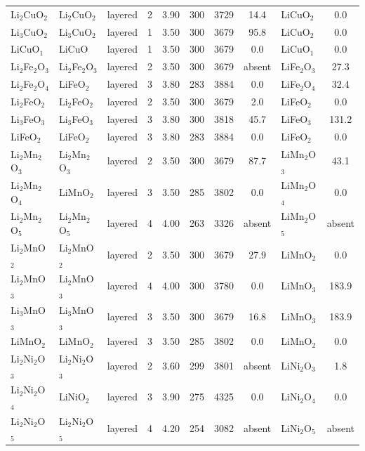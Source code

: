 \documentclass[10pt]{article}
\begin{document}
\begin{center}
\begin{longtable}{l l l c c c c c l c}
Li$_{2}$CuO$_{2}$ & Li$_{2}$CuO$_{2}$ & layered & 2 & 3.90 & 300 & 3729 & 14.4 & LiCuO$_{2}$ & 0.0 \\
Li$_{3}$CuO$_{2}$ & Li$_{3}$CuO$_{2}$ & layered & 1 & 3.50 & 300 & 3679 & 95.8 & LiCuO$_{2}$ & 0.0 \\
LiCuO$_{1}$ & LiCuO & layered & 1 & 3.50 & 300 & 3679 & 0.0 & LiCuO$_{1}$ & 0.0 \\
Li$_{2}$Fe$_{2}$O$_{3}$ & Li$_{2}$Fe$_{2}$O$_{3}$ & layered & 2 & 3.50 & 300 & 3679 & absent & LiFe$_{2}$O$_{3}$ & 27.3 \\
Li$_{2}$Fe$_{2}$O$_{4}$ & LiFeO$_{2}$ & layered & 3 & 3.80 & 283 & 3884 & 0.0 & LiFe$_{2}$O$_{4}$ & 32.4 \\
Li$_{2}$FeO$_{2}$ & Li$_{2}$FeO$_{2}$ & layered & 2 & 3.50 & 300 & 3679 & 2.0 & LiFeO$_{2}$ & 0.0 \\
Li$_{3}$FeO$_{3}$ & Li$_{3}$FeO$_{3}$ & layered & 3 & 3.80 & 300 & 3818 & 45.7 & LiFeO$_{3}$ & 131.2 \\
LiFeO$_{2}$ & LiFeO$_{2}$ & layered & 3 & 3.80 & 283 & 3884 & 0.0 & LiFeO$_{2}$ & 0.0 \\
Li$_{2}$Mn$_{2}$O$_{3}$ & Li$_{2}$Mn$_{2}$O$_{3}$ & layered & 2 & 3.50 & 300 & 3679 & 87.7 & LiMn$_{2}$O$_{3}$ & 43.1 \\
Li$_{2}$Mn$_{2}$O$_{4}$ & LiMnO$_{2}$ & layered & 3 & 3.50 & 285 & 3802 & 0.0 & LiMn$_{2}$O$_{4}$ & 0.0 \\
Li$_{2}$Mn$_{2}$O$_{5}$ & Li$_{2}$Mn$_{2}$O$_{5}$ & layered & 4 & 4.00 & 263 & 3326 & absent & LiMn$_{2}$O$_{5}$ & absent \\
Li$_{2}$MnO$_{2}$ & Li$_{2}$MnO$_{2}$ & layered & 2 & 3.50 & 300 & 3679 & 27.9 & LiMnO$_{2}$ & 0.0 \\
Li$_{2}$MnO$_{3}$ & Li$_{2}$MnO$_{3}$ & layered & 4 & 4.00 & 300 & 3780 & 0.0 & LiMnO$_{3}$ & 183.9 \\
Li$_{3}$MnO$_{3}$ & Li$_{3}$MnO$_{3}$ & layered & 3 & 3.50 & 300 & 3679 & 16.8 & LiMnO$_{3}$ & 183.9 \\
LiMnO$_{2}$ & LiMnO$_{2}$ & layered & 3 & 3.50 & 285 & 3802 & 0.0 & LiMnO$_{2}$ & 0.0 \\
Li$_{2}$Ni$_{2}$O$_{3}$ & Li$_{2}$Ni$_{2}$O$_{3}$ & layered & 2 & 3.60 & 299 & 3801 & absent & LiNi$_{2}$O$_{3}$ & 1.8 \\
Li$_{2}$Ni$_{2}$O$_{4}$ & LiNiO$_{2}$ & layered & 3 & 3.90 & 275 & 4325 & 0.0 & LiNi$_{2}$O$_{4}$ & 0.0 \\
Li$_{2}$Ni$_{2}$O$_{5}$ & Li$_{2}$Ni$_{2}$O$_{5}$ & layered & 4 & 4.20 & 254 & 3082 & absent & LiNi$_{2}$O$_{5}$ & absent \\

\end{longtable}
\end{center}
\end{document}
